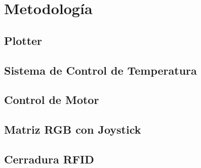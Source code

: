 \section{Metodología}

\subsection{Plotter}

\subsection{Sistema de Control de Temperatura}

\subsection{Control de Motor }

\subsection{Matriz RGB con Joystick}

\subsection{Cerradura RFID}